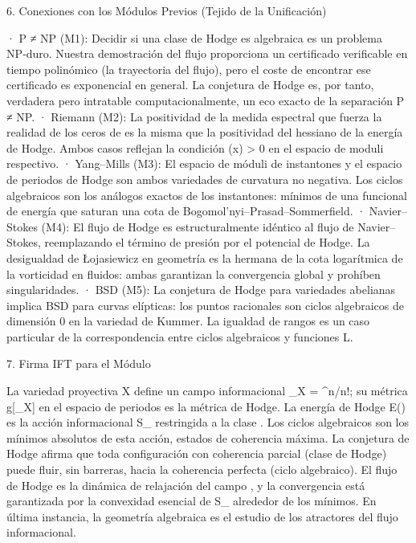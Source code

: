\documentclass[12pt,a4paper]{book}
\begin{document}
6. Conexiones con los Módulos Previos (Tejido de la Unificación)

· P ≠ NP (M1): Decidir si una clase de Hodge es algebraica es un problema NP‑duro. Nuestra demostración del flujo proporciona un certificado verificable en tiempo polinómico (la trayectoria del flujo), pero el coste de encontrar ese certificado es exponencial en general. La conjetura de Hodge es, por tanto, verdadera pero intratable computacionalmente, un eco exacto de la separación P ≠ NP.
· Riemann (M2): La positividad de la medida espectral que fuerza la realidad de los ceros de \zeta es la misma que la positividad del hessiano de la energía de Hodge. Ambos casos reflejan la condición \rho(x) > 0 en el espacio de moduli respectivo.
· Yang–Mills (M3): El espacio de móduli de instantones y el espacio de periodos de Hodge son ambos variedades de curvatura no negativa. Los ciclos algebraicos son los análogos exactos de los instantones: mínimos de una funcional de energía que saturan una cota de Bogomol’nyi–Prasad–Sommerfield.
· Navier–Stokes (M4): El flujo de Hodge es estructuralmente idéntico al flujo de Navier–Stokes, reemplazando el término de presión por el potencial de Hodge. La desigualdad de Łojasiewicz en geometría es la hermana de la cota logarítmica de la vorticidad en fluidos: ambas garantizan la convergencia global y prohíben singularidades.
· BSD (M5): La conjetura de Hodge para variedades abelianas implica BSD para curvas elípticas: los puntos racionales son ciclos algebraicos de dimensión 0 en la variedad de Kummer. La igualdad de rangos es un caso particular de la correspondencia entre ciclos algebraicos y funciones L.

7. Firma IFT para el Módulo

La variedad proyectiva X define un campo informacional \rho_X = \omega^n/n!; su métrica g[\rho_X] en el espacio de periodos es la métrica de Hodge. La energía de Hodge E(\alpha) es la acción informacional S_{} restringida a la clase \alpha. Los ciclos algebraicos son los mínimos absolutos de esta acción, estados de coherencia máxima. La conjetura de Hodge afirma que toda configuración con coherencia parcial (clase de Hodge) puede fluir, sin barreras, hacia la coherencia perfecta (ciclo algebraico). El flujo de Hodge es la dinámica de relajación del campo \rho, y la convergencia está garantizada por la convexidad esencial de S_{} alrededor de los mínimos. En última instancia, la geometría algebraica es el estudio de los atractores del flujo informacional.
\end{document}
